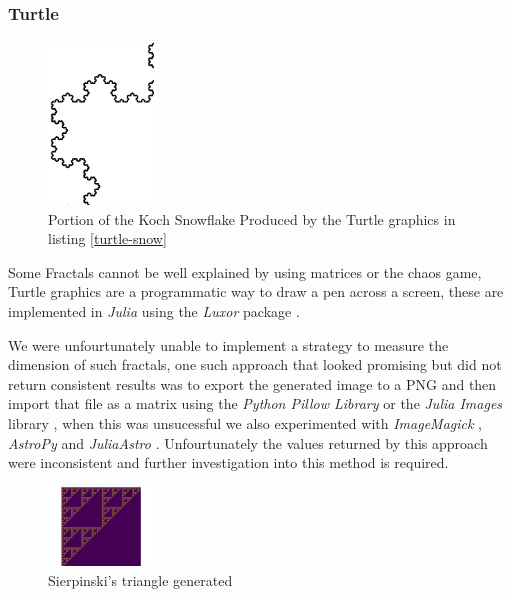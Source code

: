 \documentclass[a4paper,11pt,twoside]{article}
\begin{document}
\subsubsection{Turtle}
\label{turtle}
\begin{figure}
\centering
\includegraphics[width=0.25\textwidth]{../Problems/Chaos/Spirals/snowCurve.png}
\caption{\label{snow-turtle}Portion of the Koch Snowflake Produced by the Turtle graphics in listing \ref{turtle-snow}}
\end{figure}


Some Fractals cannot be well explained by using matrices or the chaos game, Turtle graphics are a programmatic way to draw a pen across a screen, these are implemented in \emph{Julia} using the \emph{Luxor} package \cite{JuliaGraphicsLuxorJl2020}.



We were unfourtunately unable to implement a strategy to measure the dimension
of such fractals, one such approach that looked promising but did not return
consistent results was to export the generated image to a PNG and then import
that file as a matrix using the \emph{Python Pillow Library} \cite{PillowPillowPIL} or
the \emph{Julia Images} library \cite{JuliaImagesImagesJl2020}, when this was
unsucessful we also experimented with \emph{ImageMagick} \cite{llcImageMagick},
\emph{AstroPy} \cite{Astropy} and \emph{JuliaAstro} \cite{JuliaAstroJuliaAstro}.
Unfourtunately the values returned by this approach were inconsistent and
further investigation into this method is required.


\begin{figure}
\centering
\includegraphics[width=0.25\textwidth]{media/pascal-sierpinsky-triangle.png}
\caption{\label{fig:pascal-sierpinsky}Sierpinski's triangle generated}
\end{figure}
\end{document}
